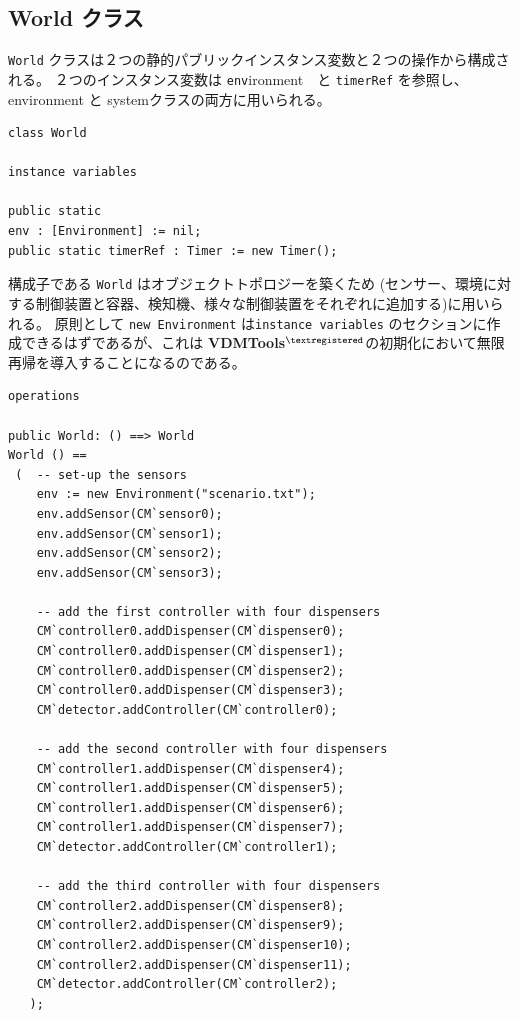 \documentclass[\pformat,12pt]{jreport}
\newcommand{\vdmtools}{\textbf{VDMTools}$^{\mathbf{{\textregistered}}}$}
\begin{document}
\subsection{World クラス}

 \texttt{World} クラスは２つの静的パブリックインスタンス変数と２つの操作から構成される。
２つのインスタンス変数は \texttt{env}ironment　と \texttt{timerRef} を参照し、environment と systemクラスの両方に用いられる。

\begin{lstlisting}
class World

instance variables
  
public static 
env : [Environment] := nil;
public static timerRef : Timer := new Timer();
\end{lstlisting}

構成子である \texttt{World} はオブジェクトトポロジーを築くため (センサー、環境に対する制御装置と容器、検知機、様々な制御装置をそれぞれに追加する)に用いられる。
原則として \texttt{new Environment} は\texttt{instance variables} のセクションに作成できるはずであるが、これは \vdmtools の初期化において無限再帰を導入することになるのである。

\begin{lstlisting}
operations

public World: () ==> World
World () ==
 (  -- set-up the sensors
    env := new Environment("scenario.txt");
    env.addSensor(CM`sensor0);
    env.addSensor(CM`sensor1);
    env.addSensor(CM`sensor2);
    env.addSensor(CM`sensor3);

    -- add the first controller with four dispensers
    CM`controller0.addDispenser(CM`dispenser0);
    CM`controller0.addDispenser(CM`dispenser1);
    CM`controller0.addDispenser(CM`dispenser2);
    CM`controller0.addDispenser(CM`dispenser3);
    CM`detector.addController(CM`controller0);

    -- add the second controller with four dispensers
    CM`controller1.addDispenser(CM`dispenser4);
    CM`controller1.addDispenser(CM`dispenser5);
    CM`controller1.addDispenser(CM`dispenser6);
    CM`controller1.addDispenser(CM`dispenser7);
    CM`detector.addController(CM`controller1);
 
    -- add the third controller with four dispensers
    CM`controller2.addDispenser(CM`dispenser8);
    CM`controller2.addDispenser(CM`dispenser9);
    CM`controller2.addDispenser(CM`dispenser10);
    CM`controller2.addDispenser(CM`dispenser11);
    CM`detector.addController(CM`controller2);
   );
\end{lstlisting}
\end{document}
